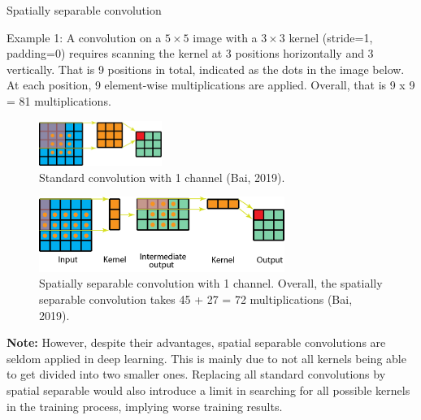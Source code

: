 \begin{vbframe}{Spatially separable convolution}
  
  Example 1: A convolution on a $5 \times 5$ image with a $3 \times 3$ kernel (stride=1, padding=0) requires scanning the kernel at 3 positions horizontally and 3 vertically. That is 9 positions in total, indicated as the dots in the image below. At each position, 9 element-wise multiplications are applied. Overall, that is 9 x 9 = 81 multiplications.
     \begin{figure}
         \centering
         \includegraphics[width=4cm]{plots/05_conv_variations/separable/sep0.png}
         \caption{Standard convolution with 1 channel (Bai, 2019).}
     \end{figure}
   
     \begin{figure}
         \centering
         \includegraphics[width=8cm]{plots/05_conv_variations/separable/sep1.png}
         \caption{Spatially separable convolution with 1 channel. Overall, the spatially separable convolution takes 45 + 27 = 72 multiplications (Bai, 2019).}
     \end{figure}
     
    

   \textbf{Note:} However, despite their advantages, spatial separable convolutions are seldom applied in deep learning. This is mainly due to not all kernels being able to get divided into two smaller ones. Replacing all standard convolutions by spatial separable would also introduce a limit in searching for all possible kernels in the training process, implying worse training results.
   
\end{vbframe}

